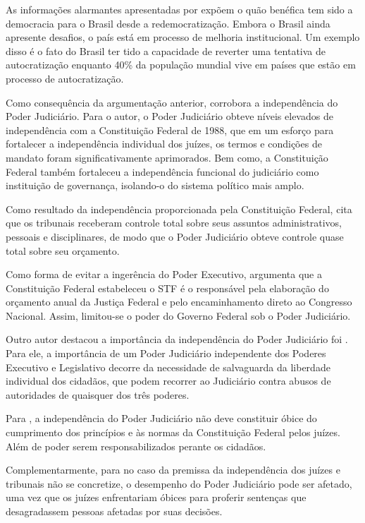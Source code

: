 As informações alarmantes apresentadas por \cite{nord2025democracy} expõem o quão benéfica tem sido a democracia para o Brasil desde a redemocratização. Embora o Brasil ainda apresente desafios, o país está em processo de melhoria institucional. Um exemplo disso é o fato do Brasil ter tido a capacidade de reverter uma tentativa de autocratização enquanto 40\%  da população mundial vive em países que estão em processo de autocratização.

Como consequência da argumentação anterior, \cite{pires2021paradoxo} corrobora a independência do Poder Judiciário. Para o autor, o Poder Judiciário obteve níveis elevados de independência com a Constituição Federal de 1988, que em um esforço para fortalecer a independência individual dos juízes, os termos e condições de mandato foram significativamente aprimorados.  Bem como, a Constituição Federal também fortaleceu a independência funcional do judiciário como instituição de governança, isolando-o do sistema político mais amplo.

Como resultado da independência proporcionada pela Constituição Federal, \cite{pires2021paradoxo} cita que os tribunais receberam controle total sobre seus assuntos administrativos, pessoais e disciplinares, de modo que o Poder Judiciário obteve controle quase total sobre seu orçamento.

Como forma de evitar a ingerência do Poder Executivo, \cite{pires2021paradoxo} argumenta que a Constituição Federal estabeleceu o STF é o responsável pela elaboração do orçamento anual da Justiça Federal e pelo encaminhamento direto ao Congresso Nacional. Assim, limitou-se o poder do Governo Federal sob o Poder Judiciário. 

Outro autor destacou a importância da independência do Poder Judiciário foi \cite{akutsu2012dimensoes}. Para ele, a importância de um Poder Judiciário independente dos Poderes Executivo e Legislativo decorre da necessidade de salvaguarda da liberdade individual dos cidadãos, que podem recorrer ao Judiciário contra abusos de autoridades de quaisquer dos três poderes. 

Para \cite{akutsu2012dimensoes}, a independência do Poder Judiciário não deve constituir óbice do cumprimento dos princípios e às normas da Constituição Federal pelos juízes. Além de poder serem responsabilizados perante os cidadãos. 

Complementarmente, para \cite{akutsu2012dimensoes} no caso da premissa da independência dos juízes e tribunais não se concretize, o desempenho do Poder Judiciário pode ser afetado, uma vez que os juízes enfrentariam óbices para  proferir sentenças que desagradassem pessoas afetadas por suas decisões.


